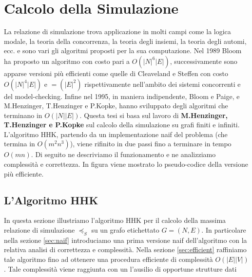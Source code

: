 \chapter{Calcolo della Simulazione}
La relazione di simulazione trova applicazione in molti campi come la logica modale, la teoria della concorrenza, la teoria degli insiemi, la teoria degli automi, ecc. e sono vari gli algoritmi proposti per la sua computazione. Nel 1989 Bloom ha proposto un algoritmo con costo pari a $O(|N|^6|E|)$, successivamente sono apparse versioni più efficienti come quelle di Cleaveland e Steffen con costo $O(|N|^4|E|)$ e $=(|E|^2)$ rispettivamente nell'ambito dei sistemi concorrenti e del model-checking. Infine nel 1995, in maniera indipendente, Bloom e Paige, e M.Henzinger, T.Henzinger e P.Kopke, hanno sviluppato degli algoritmi che terminano in $O(|N||E|)$.
Questa tesi si basa sul lavoro di \textbf{M.Henzinger, T.Henzinger e P.Kopke} sul calcolo della simulazione su grafi finiti e infiniti.\\
L'algoritmo HHK, partendo da un implementazione naif del problema (che termina in $O(m^2n^3)$), viene rifinito in due passi fino a terminare in tempo $O(mn)$. Di seguito ne descriviamo il funzionamento e ne analizziamo complessità e correttezza. In figura viene mostrato lo pseudo-codice della versione più efficiente.
\section{L'Algoritmo HHK}
In questa sezione illustriamo l'algoritmo HHK per il calcolo della massima relazione di simulazione $\preceq_S$ su un grafo etichettato $G = (N,E)$. In particolare nella sezione \ref{sec:naif} introduciamo una prima versione naif dell'algoritmo con la relativa analisi di correttezza e complessità. Nella sezione
\ref{sec:efficient} raffiniamo tale algoritmo fino ad ottenere una procedura efficiente di complessità $O(|E||V|)$. Tale  complessità viene raggiunta con un l'ausilio di opportune strutture dati
